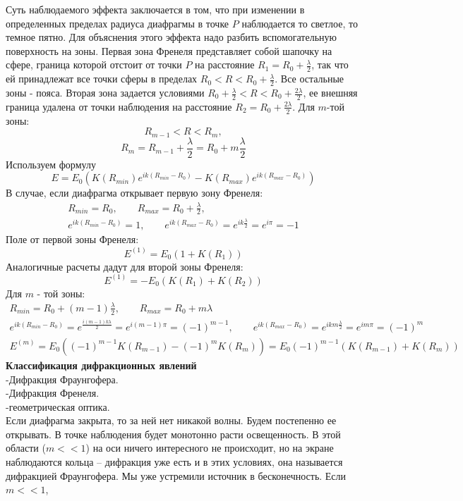 \documentclass[__main__.tex]{subfiles}
\begin{document}
Суть наблюдаемого эффекта заключается в том, что при изменении в определенных пределах радиуса диафрагмы в точке $P$ наблюдается то светлое, то темное пятно. Для объяснения этого эффекта надо разбить вспомогательную поверхность на зоны. Первая зона Френеля представляет собой шапочку на сфере, граница которой отстоит от точки $P$ на расстояние $R_1 = R_0 + \frac{\lambda}{2}$, так что ей принадлежат все точки сферы в пределах $R_0 < R < R_0 + \frac{\lambda}{2}$. Все остальные зоны - пояса. Вторая зона задается условиями $R_0 + \frac{\lambda}{2} < R < R_0 + \frac{2\lambda}{2}$, ее внешняя граница удалена от точки наблюдения на расстояние $R_2 = R_0 + \frac{2\lambda}{2}$. Для $m$-той зоны:
$$R_{m-1} < R < R_m,$$
$$R_m = R_{m-1} + \frac{\lambda}{2} = R_0 + m\frac{\lambda}{2}$$
Используем формулу
$$E = E_0\left(K(R_{min}) e^{ik(R_{min} - R_0)} - K(R_{max})e^{ik(R_{max} - R_0)} \right)$$
В случае, если диафрагма открывает первую зону Френеля:
\begin{gather*}
R_{min} = R_0, \qquad R_{max} = R_0 + \frac{\lambda}{2} , \\
e^{ik(R_{min} - R_0)} = 1, \qquad e^{ik(R_{max} - R_0)} = e^{ik\frac{\lambda}{2}} = e^{i\pi} = -1
\end{gather*}
Поле от первой зоны Френеля:
$$E^{(1)} = E_0(1 + K(R_1))$$
Аналогичные расчеты дадут для второй зоны Френеля:
$$E^{(1)} = - E_0(K(R_1) + K(R_2))$$
Для $m$ - той зоны:
\begin{gather*}
R_{min} = R_0 + (m - 1)\frac{\lambda}{2}, \qquad R_{max} = R_0 + m\lambda \\
e^{ik(R_{min} - R_0)} = e^{\frac{i(m-1)k\lambda}{2}} = e^{i(m-1)\pi} = (-1)^{m-1}, \qquad 
e^{ik(R_{max} - R_0)} = e^{ikm\frac{\lambda}{2}} = e^{im\pi} = (-1)^m\\
E^{(m)} = E_0\left((-1)^{m-1} K(R_{m-1}) - (-1)^m K(R_m)\right) = E_0(-1)^{m-1} (K(R_{m-1}) + K(R_m))
\end{gather*} 
\textbf{Классификация дифракционных явлений}\\
-Дифракция Фраунгофера.\\
-Дифракция Френеля.\\
-геометрическая
оптика.\\
Если диафрагма закрыта, то за ней нет никакой волны. Будем постепенно ее открывать. В точке наблюдения будет монотонно расти освещенность. В этой области ($m << 1$) на оси ничего интересного не происходит, но на экране наблюдаются кольца – дифракция уже есть и в этих условиях, она называется дифракцией Фраунгофера.
Мы уже устремили источник в бесконечность. Если $m << 1$,
\end{document}
